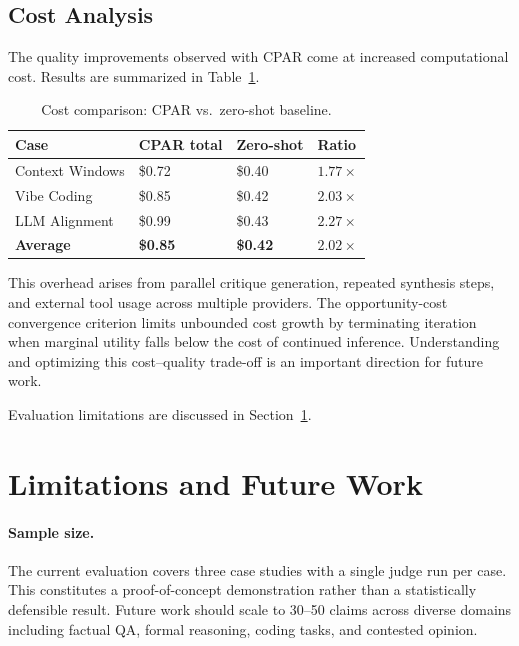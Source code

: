 \documentclass[11pt, a4paper]{article}
\begin{document}
\subsection{Cost Analysis}

The quality improvements observed with CPAR come at increased computational cost. Results are summarized in Table~\ref{tab:cost}.

\begin{table}[h]
\centering
\caption{Cost comparison: CPAR vs.\ zero-shot baseline.}
\label{tab:cost}
\begin{tabular}{@{}llll@{}}
\toprule
\textbf{Case} & \textbf{CPAR total} & \textbf{Zero-shot} & \textbf{Ratio} \\ \midrule
Context Windows & \$0.72 & \$0.40 & $1.77\times$ \\
Vibe Coding     & \$0.85 & \$0.42 & $2.03\times$ \\
LLM Alignment   & \$0.99 & \$0.43 & $2.27\times$ \\ \midrule
\textbf{Average} & \textbf{\$0.85} & \textbf{\$0.42} & $\mathbf{2.02\times}$ \\ \bottomrule
\end{tabular}
\par\vspace{4pt}
\end{table}

This overhead arises from parallel critique generation, repeated synthesis steps, and external tool usage across multiple providers. The opportunity-cost convergence criterion limits unbounded cost growth by terminating iteration when marginal utility falls below the cost of continued inference. Understanding and optimizing this cost--quality trade-off is an important direction for future work.

Evaluation limitations are discussed in Section~\ref{sec:limitations}.

\section{Limitations and Future Work}
\label{sec:limitations}

\paragraph{Sample size.} The current evaluation covers three case studies with a single judge run per case. This constitutes a proof-of-concept demonstration rather than a statistically defensible result. Future work should scale to 30--50 claims across diverse domains including factual QA, formal reasoning, coding tasks, and contested opinion.
\end{document}
